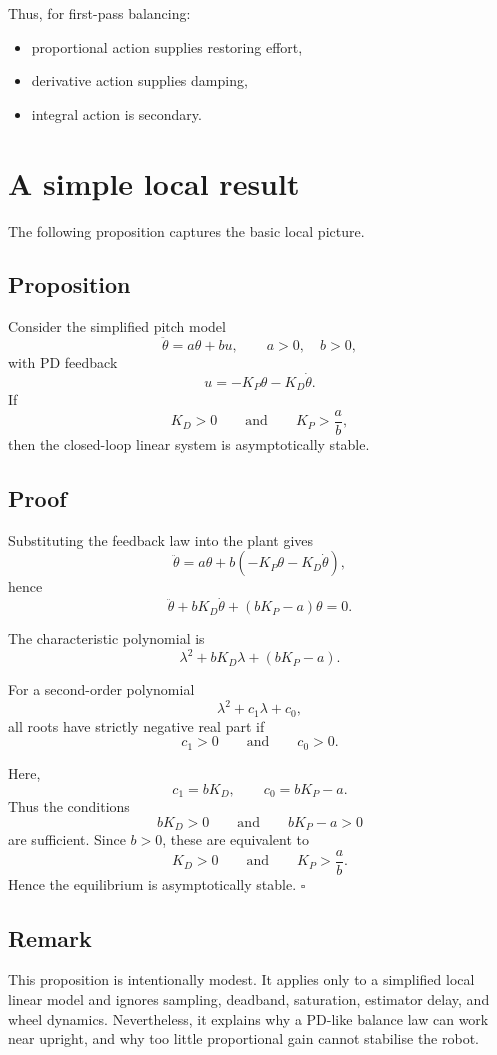 \documentclass[11pt,a4paper]{article}
\begin{document}
Thus, for first-pass balancing:
\begin{itemize}
    \item proportional action supplies restoring effort,
    \item derivative action supplies damping,
    \item integral action is secondary.
\end{itemize}

\section{A simple local result}

The following proposition captures the basic local picture.

\subsection*{Proposition}
Consider the simplified pitch model
\[
\ddot{\theta} = a\theta + bu,
\qquad a>0,\quad b>0,
\]
with PD feedback
\[
u = -K_P\theta - K_D\dot{\theta}.
\]
If
\[
K_D > 0
\qquad\text{and}\qquad
K_P > \frac{a}{b},
\]
then the closed-loop linear system is asymptotically stable.

\subsection*{Proof}
Substituting the feedback law into the plant gives
\[
\ddot{\theta} = a\theta + b(-K_P\theta - K_D\dot{\theta}),
\]
hence
\[
\ddot{\theta} + bK_D\dot{\theta} + (bK_P-a)\theta = 0.
\]

The characteristic polynomial is
\[
\lambda^2 + bK_D\lambda + (bK_P-a).
\]

For a second-order polynomial
\[
\lambda^2 + c_1\lambda + c_0,
\]
all roots have strictly negative real part if
\[
c_1 > 0
\qquad\text{and}\qquad
c_0 > 0.
\]

Here,
\[
c_1 = bK_D,\qquad c_0 = bK_P-a.
\]
Thus the conditions
\[
bK_D > 0
\qquad\text{and}\qquad
bK_P-a > 0
\]
are sufficient. Since \(b>0\), these are equivalent to
\[
K_D > 0
\qquad\text{and}\qquad
K_P > \frac{a}{b}.
\]
Hence the equilibrium is asymptotically stable. \(\square\)

\subsection*{Remark}
This proposition is intentionally modest. It applies only to a simplified local linear model and ignores sampling, deadband, saturation, estimator delay, and wheel dynamics. Nevertheless, it explains why a PD-like balance law can work near upright, and why too little proportional gain cannot stabilise the robot.
\end{document}

